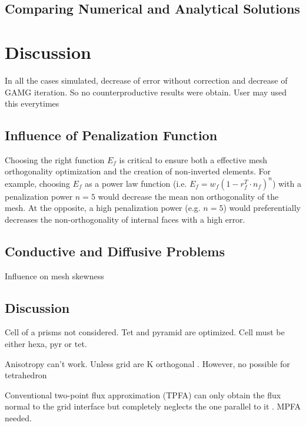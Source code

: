 \documentclass[11pt]{article}
\begin{document}
\subsection{Comparing Numerical and Analytical Solutions}





\section{Discussion}

In all the cases simulated, decrease of error without correction and decrease of GAMG iteration. 
So no counterproductive results were obtain.
User may used this everytimes

\subsection{Influence of Penalization Function}

Choosing the right function $E_f$ is critical to ensure both a effective mesh orthogonality optimization and the creation of non-inverted elements. 
For example, choosing $E_f$ as a power law function (i.e. $E_f=w_f (1-r_f^T\cdot n_f)^n$) with a penalization power $n=5$ would decrease the mean non orthogonality of the mesh.
At the opposite, a high penalization power (e.g. $n=5$) would preferentially decreases the non-orthogonality of internal faces with a high error.


\subsection{Conductive and Diffusive Problems}

Influence on mesh skewness

\subsection{Discussion}

Cell of a prisms not considered. Tet and pyramid are optimized. Cell must be either hexa, pyr or tet.

Anisotropy can't work.
Unless grid are K orthogonal \cite{heinemann_modelling_1991}.
However, no possible for tetrahedron

Conventional two-point flux approximation (TPFA) can only obtain the flux normal to the grid interface but completely neglects the one parallel to it \cite{}. MPFA needed. %
\end{document}
